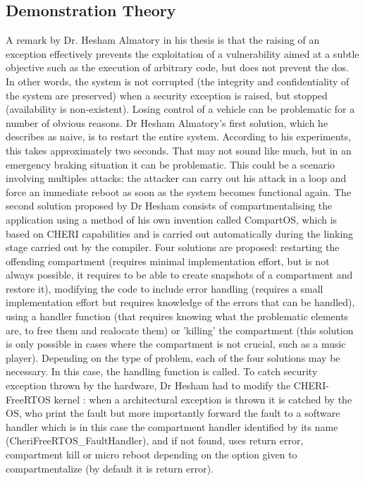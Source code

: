 \documentclass[a4paper, 11pt]{article}
\begin{document}
\subsection{Demonstration Theory}
A remark by Dr. Hesham Almatory in his thesis \cite{almatary2022compartos} is that the raising of an exception effectively prevents the exploitation of a vulnerability aimed at a subtle objective such as the execution of arbitrary code, but does not prevent the \Gls{dos}.
In other words, the system is not corrupted (the integrity and confidentiality of the system are preserved) when a security exception is raised, but stopped (availability is non-existent). Losing control of a vehicle can be problematic for a number of obvious reasons. Dr Hesham Almatory's first solution, which he describes as naive, is to restart the entire system. According to his experiments, this takes approximately two seconds. That may not sound like much, but in an emergency braking situation it can be problematic. This could be a scenario involving multiples attacks: the attacker can carry out his attack in a loop and force an immediate reboot as soon as the system becomes functional again. 
The second solution proposed by Dr Hesham consists of compartmentalising the application using a method of his own invention called CompartOS, which is based on CHERI capabilities and is carried out automatically during the linking stage carried out by the compiler. Four solutions are proposed: restarting the offending compartment (requires minimal implementation effort, but is not always possible, it requires to be able to create snapshots of a compartment and restore it), modifying the code to include error handling (requires a small implementation effort but requires knowledge of the errors that can be handled), using a handler function (that requires knowing what the problematic elements are, to free them and realocate them) or 'killing' the compartment (this solution is only possible in cases where the compartment is not crucial, such as a music player). Depending on the type of problem, each of the four solutions may be necessary. In this case, the handling function is called.
To catch security exception thrown by the hardware, Dr Hesham had to modify the CHERI-FreeRTOS kernel : when a architectural exception is thrown it is catched by the OS, who print the fault but more importantly forward the fault to a software handler which is in this case the compartment handler identified by its name (CheriFreeRTOS\_FaultHandler), and if not found, uses return error, compartment kill or micro reboot depending on the option given to compartmentalize (by default it is return error).
\end{document}
